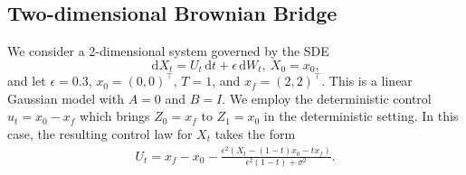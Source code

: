 \documentclass[letterpaper, 10 pt, conference]{ieeeconf}  %
\newcommand{\ud}{\,\mathrm{d}}
\begin{document}
\subsection{Two-dimensional Brownian Bridge}\label{sec:bb-exp}
We consider a 2-dimensional system governed by the SDE
\begin{equation}\label{eq:2nd-bb}
    \ud X_t = U_t \ud t + \epsilon \ud W_t, ~X_0=x_0,
\end{equation}
and let $\epsilon=0.3$, $x_0 = (0,0)^\top$, $T=1$, and $x_f = (2,2)^\top$. This is a linear Gaussian model with $A=0$ and $B=I$. We employ the deterministic control $u_t=x_0-x_f$ which brings $Z_0=x_f$ to $Z_1=x_0$ in the deterministic setting. In this case, the resulting control law for $X_t$ takes the form 
\begin{align}
    U_t=  x_f-x_0 - \frac{\epsilon^2(X_t-(1-t)x_0-tx_f)}{\epsilon^2(1-t) + \sigma^2}.\label{eq:analy-sol-u}
\end{align}
\end{document}
